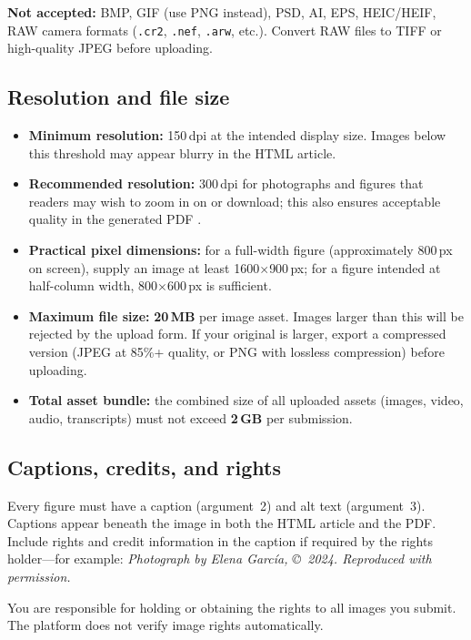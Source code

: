 \textbf{Not accepted:} BMP, GIF (use PNG instead), PSD, AI, EPS, HEIC/HEIF,
RAW camera formats (\texttt{.cr2}, \texttt{.nef}, \texttt{.arw}, etc.).
Convert RAW files to TIFF or high-quality JPEG before uploading.

\subsection{Resolution and file size}

\begin{itemize}
  \item \textbf{Minimum resolution:} 150\,dpi at the intended display
    size. Images below this threshold may appear blurry in the HTML
    article.
  \item \textbf{Recommended resolution:} 300\,dpi for photographs and
    figures that readers may wish to zoom in on or download; this also
    ensures acceptable quality in the generated PDF \citep{andersen2022embodied}.
  \item \textbf{Practical pixel dimensions:} for a full-width figure
    (approximately 800\,px on screen), supply an image at least
    1600$\times$900\,px; for a figure intended at half-column width,
    800$\times$600\,px is sufficient.
  \item \textbf{Maximum file size:} \textbf{20\,MB} per image asset.
    Images larger than this will be rejected by the upload form. If your
    original is larger, export a compressed version (JPEG at 85\%+
    quality, or PNG with lossless compression) before uploading.
  \item \textbf{Total asset bundle:} the combined size of all uploaded
    assets (images, video, audio, transcripts) must not exceed
    \textbf{2\,GB} per submission.
\end{itemize}

\subsection{Captions, credits, and rights}

Every figure must have a caption (argument~2) and alt text (argument~3).
Captions appear beneath the image in both the HTML article and the PDF.
Include rights and credit information in the caption if required by the
rights holder---for example: \emph{Photograph by Elena Garc\'ia,
\copyright~2024. Reproduced with permission.}

You are responsible for holding or obtaining the rights to all images
you submit. The platform does not verify image rights automatically.

